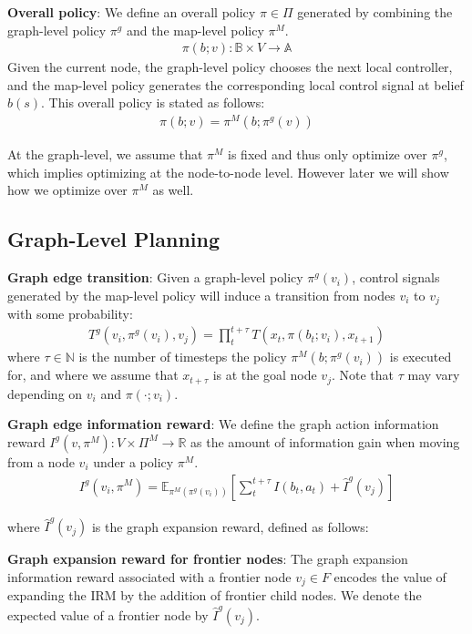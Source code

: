 \documentclass[letterpaper, 10 pt, conference]{ieeeconf}  %
\newcommand{\ph}[1]{{\textbf{#1}:}} %
\begin{document}
\ph{Overall policy}
We define an overall policy $\pi \in \Pi$ generated by combining the graph-level policy $\pi^g$ and the map-level policy $\pi^M$.
\begin{align}
    \pi(b;v):\mathbb{B}\times V\rightarrow \mathbb{A}
\end{align}
Given the current node, the graph-level policy chooses the next local controller, and the map-level policy generates the corresponding local control signal at belief $b(s)$. This overall policy is stated as follows:
\begin{align}
    \pi(b;v) = \pi^M(b; \pi^g(v))
\end{align}

At the graph-level, we assume that $\pi^M$ is fixed and thus only optimize over $\pi^g$, which implies optimizing at the node-to-node level. However later we will show how we optimize over $\pi^M$ as well.

\subsection{Graph-Level Planning}

\ph{Graph edge transition}
Given a graph-level policy $\pi^{g}(v_i)$, control signals generated by the map-level policy will induce a  transition from nodes $v_i$ to $v_j$ with some probability:
\begin{align}
    T^{g} (v_i, \pi^g(v_i), v_j) = \prod_{t}^{t+\tau} T(x_t,\pi(b_t;v_i),x_{t+1})
\end{align}
where $\tau\in\mathbb{N}$ is the number of timesteps the policy $\pi^M(b;\pi^g(v_i))$ is executed for, and where we assume that $x_{t+\tau}$ is at the goal node $v_j$.  Note that $\tau$ may vary depending on $v_i$ and $\pi(\cdot;v_i)$.

\ph{Graph edge information reward}
We define the graph action information reward $I^g(v, \pi^M): V \times \Pi^M \to \mathbb{R}$ as the amount of information gain when moving from a node $v_i$ under a policy $\pi^M$.
\begin{align}
    I^g(v_i,\pi^M) = \mathbb{E}_{\pi^M(\pi^g(v_i))}\left[\sum_{t}^{t+\tau}  I(b_t,a_t)+\hat{I}^{g}(v_j)\right]
    \label{eq:graph_action_info_reward}
\end{align}

where $\hat{I}^{g}(v_j)$ is the graph expansion reward, defined as follows:

\ph{Graph expansion reward for frontier nodes}
The graph expansion information reward associated with a frontier node $v_j \in F$ encodes the value of expanding the IRM by the addition of frontier child nodes. We denote the expected value of a frontier node by $\hat{I}^{g}(v_j)$.
\end{document}
